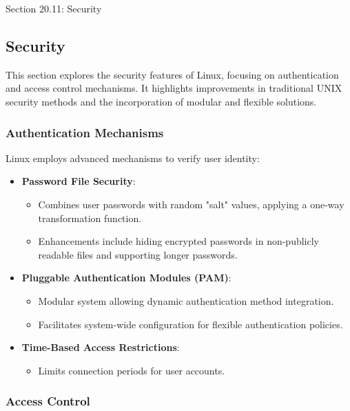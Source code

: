 \begin{notes}{Section 20.11: Security}
    \subsection*{Security}

    This section explores the security features of Linux, focusing on authentication and access control mechanisms. It highlights improvements in traditional UNIX security methods and the incorporation 
    of modular and flexible solutions.
    
    \subsubsection*{Authentication Mechanisms}
    
    Linux employs advanced mechanisms to verify user identity:
    \begin{itemize}
        \item \textbf{Password File Security}:
        \begin{itemize}
            \item Combines user passwords with random "salt" values, applying a one-way transformation function.
            \item Enhancements include hiding encrypted passwords in non-publicly readable files and supporting longer passwords.
        \end{itemize}
        \item \textbf{Pluggable Authentication Modules (PAM)}:
        \begin{itemize}
            \item Modular system allowing dynamic authentication method integration.
            \item Facilitates system-wide configuration for flexible authentication policies.
        \end{itemize}
        \item \textbf{Time-Based Access Restrictions}:
        \begin{itemize}
            \item Limits connection periods for user accounts.
        \end{itemize}
    \end{itemize}
    
    \subsubsection*{Access Control}
    

\end{notes}
